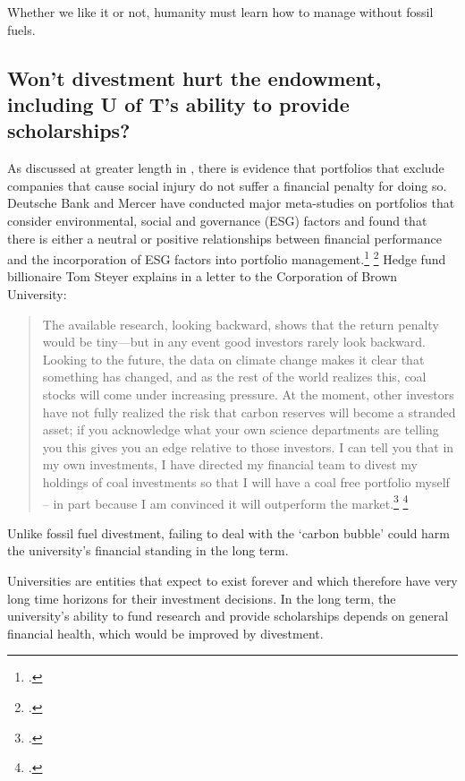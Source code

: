Whether we like it or not, humanity must learn how to manage without fossil fuels.



	\subsection{Won't divestment hurt the endowment, including U of T's ability to provide scholarships?}
	\label{HurtEndowment}
	
	
	
As discussed at greater length in , there is evidence that portfolios that exclude companies that cause social injury do not suffer a financial penalty for doing so.
Deutsche Bank and Mercer have conducted major meta-studies on portfolios that consider environmental, social and governance (ESG) factors and found that there is either a neutral or positive relationships between financial performance and the incorporation of ESG factors into portfolio management.\footcite{DeutscheBankSI} \footcite{MercerRI}
Hedge fund billionaire Tom Steyer explains in a letter to the Corporation of Brown University:
\begin{quote}
The available research, looking backward, shows that the return penalty would be tiny—but in any event good investors rarely look backward. Looking to the future, the data on climate change makes it clear that something has changed, and as the rest of the world realizes this, coal stocks will come under increasing pressure. At the moment, other investors have not fully realized the risk that carbon reserves will become a stranded asset; if you acknowledge what your own science departments are telling you this gives you an edge relative to those investors. I can tell you that in my own investments, I have directed my financial team to divest my holdings of coal investments so that I will have a coal free portfolio myself – in part because I am convinced it will outperform the market.\footcite[][]{SteyerBrownLetter} \footcite[See also: ][]{SteyerMiddleburyLetter}
\end{quote}
Unlike fossil fuel divestment, failing to deal with the `carbon bubble' could harm the university's financial standing in the long term.



Universities are entities that expect to exist forever and which therefore have very long time horizons for their investment decisions.
In the long term, the university's ability to fund research and provide scholarships depends on general financial health, which would be improved by divestment.




